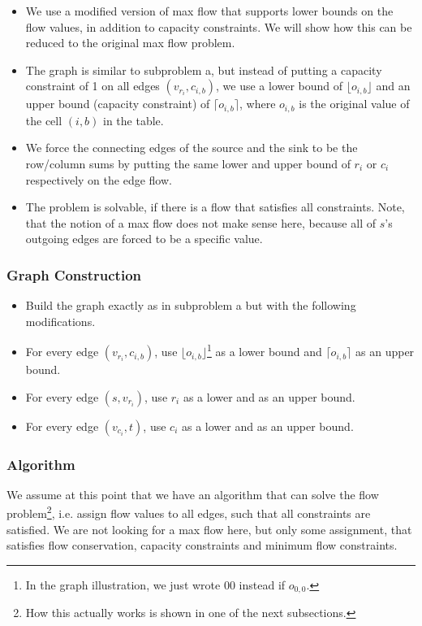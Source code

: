 \documentclass[12pt]{article}
\begin{document}
\begin{itemize}
	\item We use a modified version of max flow that supports lower bounds on the flow values, in addition to capacity constraints. We will show how this can be reduced to the original max flow problem.
	\item The graph is similar to subproblem a, but instead of putting a capacity constraint of 1 on all edges $(v_{r_i}, c_{i, b})$, we use a lower bound of $\lfloor o_{i,b} \rfloor$ and an upper bound (capacity constraint) of $\lceil o_{i,b} \rceil$, where $o_{i,b}$ is the original value of the cell $(i, b)$ in the table.
	\item We force the connecting edges of the source and the sink to be the row/column sums by putting the same lower and upper bound of $r_i$ or $c_i$ respectively on the edge flow.
	\item The problem is solvable, if there is a flow that satisfies all constraints. Note, that the notion of a max flow does not make sense here, because all of $s$'s outgoing edges are forced to be a specific value.
\end{itemize}

\subsubsection*{Graph Construction}
\begin{itemize}
	\item Build the graph exactly as in subproblem a but with the following modifications.
	\item For every edge $(v_{r_i}, c_{i,b})$, use $\lfloor o_{i,b} \rfloor$\footnote{In the graph illustration, we just wrote $00$ instead if $o_{0,0}$.} as a lower bound and $\lceil o_{i,b} \rceil$ as an upper bound.
	\item For every edge $(s, v_{r_i})$, use $r_i$ as a lower and as an upper bound.
	\item For every edge $(v_{c_i}, t)$, use $c_i$ as a lower and as an upper bound.
\end{itemize}

\subsubsection*{Algorithm}
We assume at this point that we have an algorithm that can solve the flow problem\footnote{How this actually works is shown in one of the next subsections.}, i.e. assign flow values to all edges, such that all constraints are satisfied. We are not looking for a max flow here, but only some assignment, that satisfies flow conservation, capacity constraints and minimum flow constraints.
\end{document}
